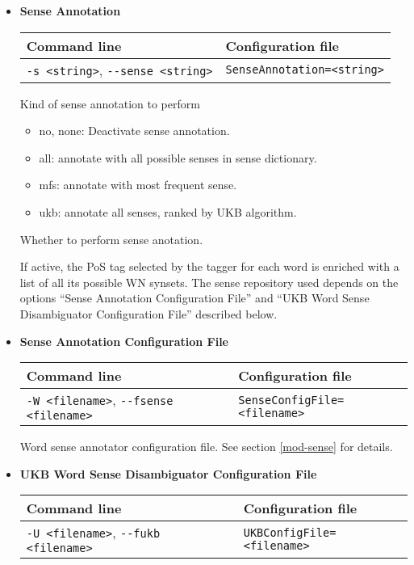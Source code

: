\documentclass[a4paper]{book}
\begin{document}
\begin{itemize}
\item {\bf Sense Annotation}

\begin{tabular}{|l|l|}
Command line       & Configuration file   \\ \hline
\verb#-s <string>#, \verb#--sense <string>#    & \verb#SenseAnnotation=<string>#    \\ \hline
\end{tabular}

   Kind of sense annotation to perform
 \begin{itemize}
  \item no, none: Deactivate sense annotation.
  \item all: annotate with all possible senses in sense dictionary.
  \item mfs: annotate with most frequent sense.
  \item ukb: annotate all senses, ranked by UKB algorithm.
 \end{itemize}

   Whether to perform sense anotation.

  If active, the PoS tag
   selected by the tagger for each word is enriched with a list of all
   its possible WN synsets. The sense repository used depends on the
   options  ``Sense Annotation Configuration File'' and ``UKB Word 
   Sense Disambiguator Configuration File'' described below.

\item {\bf Sense Annotation Configuration File}

\begin{tabular}{|l|l|}
Command line       & Configuration file   \\ \hline
\verb#-W <filename>#, \verb#--fsense <filename>#   & \verb#SenseConfigFile=<filename>#  \\ \hline
\end{tabular}

  Word sense annotator configuration file.
  See section \ref{mod-sense} for details.

\item {\bf UKB Word Sense Disambiguator Configuration File}

\begin{tabular}{|l|l|}
Command line       & Configuration file   \\ \hline
\verb#-U <filename>#, \verb#--fukb <filename>#   & \verb#UKBConfigFile=<filename>#  \\ \hline
\end{tabular}


\end{itemize}
\end{document}
